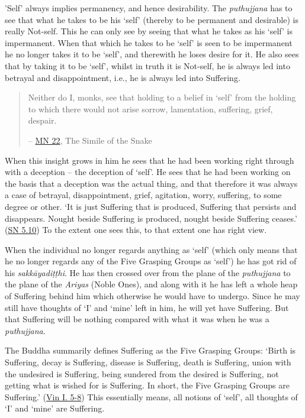 \label{ch-11-impermanent}'Self' always implies permanency, and hence desirability. The \emph{puthujjana} has to see that what he takes to be his `self' (thereby to be permanent and desirable) is really Not-self. This he can only see by seeing that what he takes as his `self' is impermanent. When that which he takes to be `self' is seen to be impermanent he no longer takes it to be `self', and therewith he loses desire for it. He also sees that by taking it to be `self', whilst in truth it is Not-self, he is always led into betrayal and disappointment, i.e., he is always led into Suffering.

\enlargethispage{\baselineskip}

\begin{quote}
Neither do I, monks, see that holding to a belief in `self' from the holding to which there would not arise sorrow, lamentation, suffering, grief, despair.

 -- \href{https://suttacentral.net/mn22/en/bodhi}{MN 22}, The Simile of the Snake
\end{quote}

When this insight grows in him he sees that he had been working right through with a deception -- the deception of `self'. He sees that he had been working on the basis that a deception was the actual thing, and that therefore it was always a case of betrayal, disappointment, grief, agitation, worry, suffering, to some degree or other. `It is just Suffering that is produced, Suffering that persists and disappears. Nought beside Suffering is produced, nought beside Suffering ceases.' (\href{https://suttacentral.net/sn5.10/en/bodhi}{SN 5.10}) To the extent one sees this, to that extent one has right view.

When the individual no longer regards anything as `self' (which only means that he no longer regards any of the Five Grasping Groups as `self') he has got rid of his \emph{sakkāyadiṭṭhi}. He has then crossed over from the plane of the \emph{puthujjana} to the plane of the \emph{Ariyas} (Noble Ones), and along with it he has left a whole heap of Suffering behind him which otherwise he would have to undergo. Since he may still have thoughts of `I' and `mine' left in him, he will yet have Suffering. But that Suffering will be nothing compared with what it was when he was a \emph{puthujjana}.

The Buddha summarily defines Suffering as the Five Grasping Groups: `Birth is Suffering, decay is Suffering, disease is Suffering, death is Suffering, union with the undesired is Suffering, being sundered from the desired is Suffering, not getting what is wished for is Suffering. In short, the Five Grasping Groups are Suffering.' (\href{https://suttacentral.net/pli-tv-kd1/en/brahmali}{Vin I. 5-8}) This essentially means, all notions of `self', all thoughts of `I' and `mine' are Suffering.

